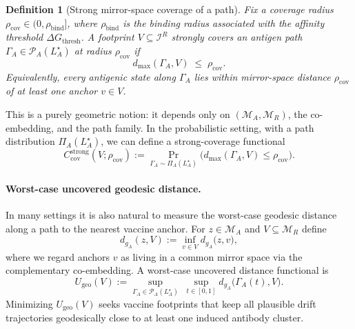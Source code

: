 \documentclass[11pt]{article}
\newtheorem{definition}{Definition}
\begin{document}
\begin{definition}[Strong mirror-space coverage of a path]
\label{def:strong-path-coverage}
Fix a coverage radius $\rho_{\mathrm{cov}} \in (0,\rho_{\mathrm{bind}}]$, where $\rho_{\mathrm{bind}}$ is
the binding radius associated with the affinity threshold
$\Delta G_{\mathrm{thresh}}$.
A footprint $V \subseteq \mathcal{I}^R$ \emph{strongly covers} an antigen path
$\Gamma_A \in \mathcal{P}_A(L_A^\star)$ at radius $\rho_{\mathrm{cov}}$ if
\begin{equation}
  d_{\max}(\Gamma_A,V) \;\le\; \rho_{\mathrm{cov}}.
\end{equation}
Equivalently, every antigenic state along $\Gamma_A$ lies within mirror-space distance
$\rho_{\mathrm{cov}}$ of at least one anchor $v \in V$.
\end{definition}

This is a purely geometric notion: it depends only on $(\mathcal{M}_A,\mathcal{M}_R)$, the
co-embedding, and the path family. In the probabilistic setting, with a path distribution
$\Pi_A(L_A^\star)$, we can define a strong-coverage functional
\begin{equation}
  C_{\mathrm{cov}}^{\mathrm{strong}}(V;\rho_{\mathrm{cov}})
  := \Pr_{\Gamma_A \sim \Pi_A(L_A^\star)}
     \bigl( d_{\max}(\Gamma_A,V) \le \rho_{\mathrm{cov}} \bigr).
\end{equation}

\paragraph{Worst-case uncovered geodesic distance.}
In many settings it is also natural to measure the worst-case geodesic distance along a path to
the nearest vaccine anchor. For $z \in \mathcal{M}_A$ and $V \subseteq \mathcal{M}_R$ define
\[
  d_{g_A}(z,V) := \inf_{v \in V} d_{g_A}\bigl(z,v\bigr),
\]
where we regard anchors $v$ as living in a common mirror space via the complementary
co-embedding. A worst-case uncovered distance functional is
\begin{equation}
  U_{\mathrm{geo}}(V)
  := \sup_{\Gamma_A \in \mathcal{P}_A(L_A^\star)}
     \;\sup_{t \in [0,1]} d_{g_A}\bigl(\Gamma_A(t),V\bigr).
\end{equation}
Minimizing $U_{\mathrm{geo}}(V)$ seeks vaccine footprints that keep all plausible drift trajectories
geodesically close to at least one induced antibody cluster.
\end{document}
